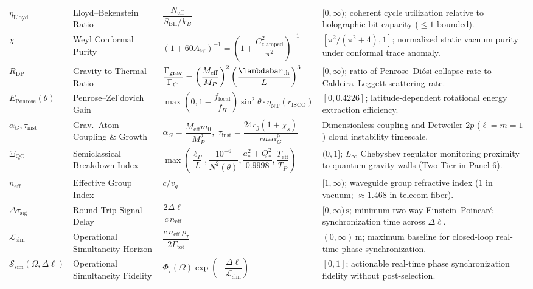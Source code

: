 \documentclass[11pt,a4paper]{article}
\begin{document}
\begin{longtable}{>{\raggedright\arraybackslash}p{2.2cm} >{\raggedright\arraybackslash}p{3.4cm} >{\raggedright\arraybackslash}p{4.6cm} >{\raggedright\arraybackslash}p{5.2cm}}
$\eta_{\mathrm{Lloyd}}$ & Lloyd--Bekenstein Ratio & $\dfrac{N_{\mathrm{eff}}}{S_{\mathrm{BH}} / k_B}$ & $[0, \infty)$; coherent cycle utilization relative to holographic bit capacity ($\leq 1$ bounded). \\[1.4ex]
$\chi$ & Weyl Conformal Purity & $(1 + 60 A_W)^{-1} = \left(1 + \dfrac{C_{\mathrm{clamped}}^2}{\pi^2}\right)^{-1}$ & $[\pi^2/(\pi^2+4), 1]$; normalized static vacuum purity under conformal trace anomaly. \\[1.4ex]
$R_{\mathrm{DP}}$ & Gravity-to-Thermal Ratio & $\dfrac{\Gamma_{\mathrm{grav}}}{\Gamma_{\mathrm{th}}} = \left(\dfrac{M_{\mathrm{eff}}}{M_P}\right)^2 \left(\dfrac{\lambdabar_{\mathrm{th}}}{L}\right)^3$ & $[0, \infty)$; ratio of Penrose--Diósi collapse rate to Caldeira--Leggett scattering rate. \\[1.4ex]
$E_{\mathrm{Penrose}}(\theta)$ & Penrose--Zel'dovich Gain & $\max\!\left(0, 1 - \dfrac{f_{\mathrm{local}}}{f_H}\right)\sin^2\theta \cdot \eta_{\mathrm{NT}}(r_{\mathrm{ISCO}})$ & $[0, 0.4226]$; latitude-dependent rotational energy extraction efficiency. \\[1.4ex]
$\alpha_G, \tau_{\mathrm{inst}}$ & Grav.\ Atom Coupling \& Growth & $\alpha_G = \dfrac{M_{\mathrm{eff}} m_0}{M_P^2},\; \tau_{\mathrm{inst}} = \dfrac{24 r_g (1+\chi_s)}{c a_* \alpha_G^9}$ & Dimensionless coupling and Detweiler $2p$ ($\ell=m=1$) cloud instability timescale. \\[1.4ex]
$\Xi_{\mathrm{QG}}$ & Semiclassical Breakdown Index & $\max\!\left(\dfrac{\ell_P}{L}, \dfrac{10^{-6}}{N^2(\theta)}, \dfrac{a_*^2+Q_*^2}{0.9998}, \dfrac{T_{\mathrm{eff}}}{T_P}\right)$ & $(0, 1]$; $L_\infty$ Chebyshev regulator monitoring proximity to quantum-gravity walls (Two-Tier in Panel 6). \\[1.4ex]
\midrule
$n_{\mathrm{eff}}$ & Effective Group Index & $c / v_g$ & $[1, \infty)$; waveguide group refractive index ($1$ in vacuum; $\approx 1.468$ in telecom fiber). \\[1.2ex]
$\Delta\tau_{\mathrm{sig}}$ & Round-Trip Signal Delay & $\dfrac{2\Delta\ell}{c\, n_{\mathrm{eff}}}$ & $[0, \infty)\,\mathrm{s}$; minimum two-way Einstein--Poincaré synchronization time across $\Delta\ell$. \\[1.4ex]
$\mathcal{L}_{\mathrm{sim}}$ & Operational Simultaneity Horizon & $\dfrac{c\, n_{\mathrm{eff}}\, \rho_\tau}{2\Gamma_{\mathrm{tot}}}$ & $(0, \infty)\,\mathrm{m}$; maximum baseline for closed-loop real-time phase synchronization. \\[1.4ex]
$\mathcal{S}_{\mathrm{sim}}(\Omega,\Delta\ell)$ & Operational Simultaneity Fidelity & $\Phi_\tau(\Omega)\exp\!\left(-\dfrac{\Delta\ell}{\mathcal{L}_{\mathrm{sim}}}\right)$ & $[0, 1]$; actionable real-time phase synchronization fidelity without post-selection. \\[1.4ex]

\end{longtable}
\end{document}
